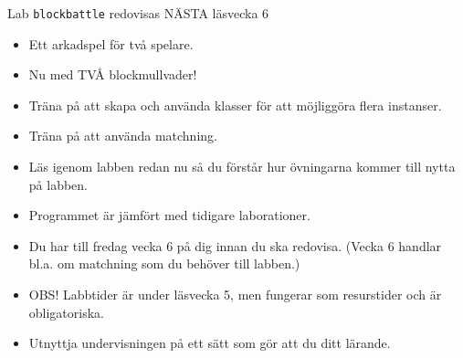 \begin{SlideExtra}{Lab \texttt{blockbattle} redovisas NÄSTA läsvecka 6}
\begin{minipage}{0.59\textwidth}
    \begin{itemize}\SlideFontTiny
      \item Ett arkadspel för två spelare.
      \item Nu med TVÅ blockmullvader!
      \item Träna på att skapa och använda klasser för att möjliggöra flera instanser.
      \item Träna på att använda matchning.
      \item Läs igenom labben redan nu så du förstår hur övningarna kommer till nytta på labben.
      \item Programmet  är  jämfört med tidigare laborationer.
      \item Du har till fredag vecka 6 på dig innan du ska redovisa. (Vecka 6 handlar bl.a. om matchning som du behöver till labben.)
      \item OBS! Labbtider är  under läsvecka 5, men fungerar som resurstider och är  obligatoriska. 
      \item Utnyttja undervisningen på ett sätt som gör att du  ditt lärande.  
    \end{itemize}    
  \end{minipage}
\end{SlideExtra}
  
\fi

